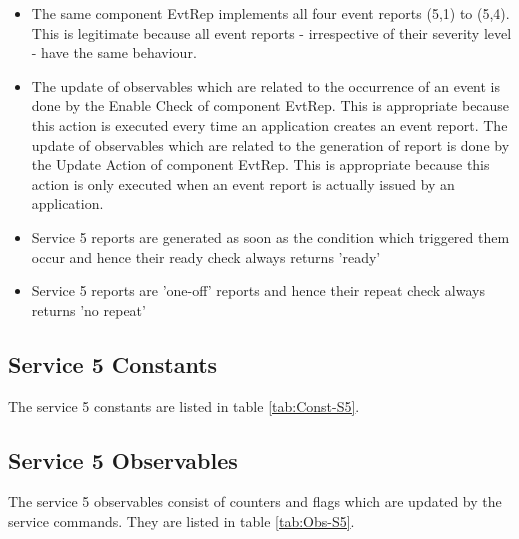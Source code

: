 \documentclass{pnp_article}
\begin{document}
\begin{itemize}
\item The same component EvtRep implements all four event reports (5,1) to (5,4). This is legitimate because all event reports - irrespective of their severity level - have the same behaviour. 
\item The update of observables which are related to the occurrence of an event is done by the Enable Check of component EvtRep. This is appropriate because this action is executed every time an application creates an event report. The update of observables which are related to the generation of report is done by the Update Action of component EvtRep. This is appropriate because this action is only executed when an event report is actually issued by an application.
\item Service 5 reports are generated as soon as the condition which triggered them occur and hence their ready check always returns 'ready'
\item Service 5 reports are 'one-off' reports and hence their repeat check always returns 'no repeat'
\end{itemize}

\newpage
{}
\newpage
{}
\newpage
{}
\newpage
{}


\newpage
\subsection{Service 5 Constants}\label{sec:serv5Const}
The service 5 constants are listed in table \ref{tab:Const-S5}. 



\subsection{Service 5 Observables}\label{sec:serv5Obs}
The service 5 observables consist of counters and flags which are updated by the service commands. They are listed in table \ref{tab:Obs-S5}.
\end{document}
